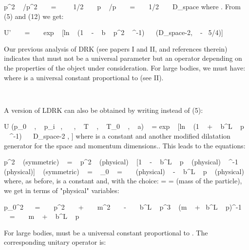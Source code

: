\documentclass[a4paper,12pt,dvips]{article}
\begin{document}
\equation
p^2 ~ \partial /\partial p^2 ~ ~ =~ ~ ~ 1/2 ~ ~ p ~ \partial /\partial p ~ ~ = ~ ~ 1/2 ~ ~ D_{space}
\endequation
\noindent
where \coordHE{} . From (5) and (12) we get:

\equation
U' ~ ~ = ~ ~ exp ~ [ln ~ (1 ~ - ~ b ~ p^2 ~ \sigma ^{-1}) ~ ~(D_{space-2,\sigma } ~ - ~5/4)]
\endequation
\noindent

Our previous analysis of DRK (see papers I and II, and references therein) indicates that \coordHE{} must not be a universal parameter but an operator depending on the properties of the object under consideration. For large bodies, we must have: \coordHE{} where \coordHE{} is a universal constant proportional to \coordHE{} (see II).

~ 

A version of LDRK can also be obtained by writing instead of (5):

\equation
U (p_0 ~ , ~ p_i ~,~ \sigma  ~ , ~ T ~ , ~ T_0 ~ , ~ a) ~ = exp ~ [ln ~ (1 ~ + ~ b^L ~ p ~ \sigma ^{-1}) ~ ~D_{space-2 , }]
\endequation
\noindent
where \coordHE{} is a constant and \coordHE{} another modified dilatation generator for the space and \myHighlight{$\sigma$}\coordHE{} momentum dimensions.. This leads to the equations:

\equation
p^2 ~ (symmetric) ~ = ~ p^2 ~ (physical) ~ [1 ~ - ~ b^L ~ p ~ (physical) ~ \sigma ^{-1} ~ (physical)]
\endequation
\equation
\sigma ~ (symmetric) ~ = ~ \sigma _0 ~ = ~ \sigma ~ (physical) ~ - ~ b^L ~ p ~ (physical)
\endequation
\noindent
where, as before, \coordHE{} is a constant and, with the choice: \coordHE{} = \coordHE{} = \coordHE{} (mass of the particle), we get in terms of "physical" variables:

\equation
p_0^2~ ~ = ~ ~ p^2 ~ ~ + ~ ~ m^2 ~ ~ - ~ ~ b^L ~ p^3 ~ (m ~ +~ b^L ~ p)^{-1}
\endequation
\equation
\sigma ~ ~ = ~ ~ m ~ + ~ b^L ~ p
\endequation

For large bodies, \coordHE{} must be a universal constant proportional to \coordHE{} . The corresponding unitary operator is:
\end{document}
